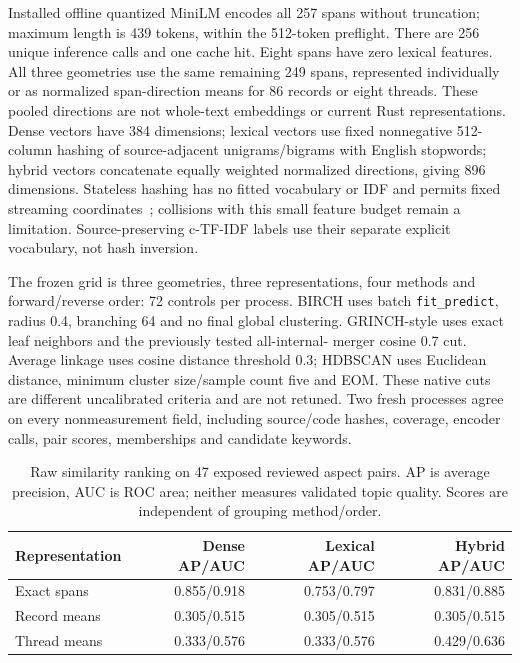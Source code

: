 \documentclass[11pt]{article}
\begin{document}
Installed offline quantized MiniLM encodes all 257 spans without truncation;
maximum length is 439 tokens, within the 512-token preflight. There are 256
unique inference calls and one cache hit. Eight spans have zero lexical
features. All three geometries use the same remaining 249 spans, represented
individually or as normalized span-direction means for 86 records or eight
threads. These pooled directions are not whole-text embeddings or current Rust
representations. Dense vectors have 384 dimensions; lexical vectors use fixed
nonnegative 512-column hashing of source-adjacent unigrams/bigrams with English
stopwords; hybrid vectors concatenate equally weighted normalized directions,
giving 896 dimensions. Stateless hashing has no fitted vocabulary or IDF and
permits fixed streaming coordinates~\cite{hashingvectorizer}; collisions with
this small feature budget remain a limitation. Source-preserving c-TF-IDF
labels use their separate explicit vocabulary, not hash inversion.

The frozen grid is three geometries, three representations, four methods and
forward/reverse order: 72 controls per process. BIRCH uses batch
\texttt{fit\_predict}, radius 0.4, branching 64 and no final global clustering.
GRINCH-style uses exact leaf neighbors and the previously tested all-internal-
merger cosine 0.7 cut. Average linkage uses cosine distance threshold 0.3;
HDBSCAN uses Euclidean distance, minimum cluster size/sample count five and EOM.
These native cuts are different uncalibrated criteria and are not retuned.
Two fresh processes agree on every nonmeasurement field, including source/code
hashes, coverage, encoder calls, pair scores, memberships and candidate keywords.

\begin{table}[ht]
\centering
\begin{tabular}{lrrr}
\toprule
Representation &Dense AP/AUC&Lexical AP/AUC&Hybrid AP/AUC\\
\midrule
Exact spans &0.855/0.918&0.753/0.797&0.831/0.885\\
Record means &0.305/0.515&0.305/0.515&0.305/0.515\\
Thread means &0.333/0.576&0.333/0.576&0.429/0.636\\
\bottomrule
\end{tabular}
\caption{Raw similarity ranking on 47 exposed reviewed aspect pairs. AP is
average precision, AUC is ROC area; neither measures validated topic quality.
Scores are independent of grouping method/order.}
\end{table}
\end{document}
